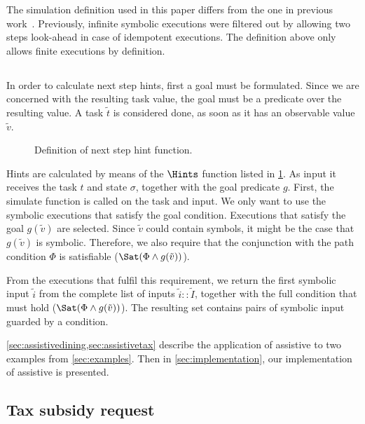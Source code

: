 The simulation definition used in this paper differs from the one in previous work~\cite{Naus2019}.
Previously, infinite symbolic executions were filtered out by allowing two steps look-ahead in case of idempotent executions.
The definition above only allows finite executions by definition.




\subsection{}


In order to calculate next step hints, first a goal must be formulated.
Since we are concerned with the resulting task value, the goal must be a predicate over the resulting value.
A task $\tilde{t}$ is considered done, as soon as it has an observable value $\tilde{v}$.

\begin{figure}
  \caption{Definition of next step hint function.}
  \label{fig:hints}
\end{figure}


Hints are calculated by means of the $\Hints$ function listed in \cref{fig:hints}.
As input it receives the task $t$ and state $\sigma$, together with the goal predicate $g$.
First, the simulate function is called on the task and input.
We only want to use the symbolic executions that satisfy the goal condition.
Executions that satisfy the goal $g(\tilde{v})$ are selected.
Since $\tilde{v}$ could contain symbols, it might be the case that $g(\tilde{v})$ is symbolic.
Therefore, we also require that the conjunction with the path condition $\Phi$ is satisfiable ($\Sat(\Phi\land g(\tilde{v}))$).

From the executions that fulfil this requirement, we return the first symbolic input $\tilde{i}$ from the complete list of inputs $\tilde{i}::\tilde{I}$,
together with the full condition that must hold ($\Sat(\Phi\land g(\tilde{v}))$).
The resulting set contains pairs of symbolic input guarded by a condition.

\cref{sec:assistivedining,sec:assistivetax} describe the application of assistive \TOPHAT to two examples from \cref{sec:examples}.
Then in \cref{sec:implementation}, our implementation of assistive \TOPHAT is presented.


\subsection{Tax subsidy request}
\label{sec:assistivetax}


